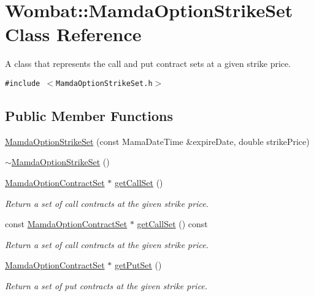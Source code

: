 \hypertarget{classWombat_1_1MamdaOptionStrikeSet}{
\section{Wombat::Mamda\-Option\-Strike\-Set Class Reference}
\label{classWombat_1_1MamdaOptionStrikeSet}
}
A class that represents the call and put contract sets at a given strike price.  


{\tt \#include $<$Mamda\-Option\-Strike\-Set.h$>$}

\subsection*{Public Member Functions}
\begin{CompactItemize}
\item 
\hyperlink{classWombat_1_1MamdaOptionStrikeSet_b92d440338d96f89c7dea5b4533e887b}{Mamda\-Option\-Strike\-Set} (const Mama\-Date\-Time \&expire\-Date, double strike\-Price)
\item 
\hyperlink{classWombat_1_1MamdaOptionStrikeSet_f37e76aea47c9c23f9ba2a0c5c2a6d6f}{$\sim$Mamda\-Option\-Strike\-Set} ()
\item 
\hyperlink{classWombat_1_1MamdaOptionContractSet}{Mamda\-Option\-Contract\-Set} $\ast$ \hyperlink{classWombat_1_1MamdaOptionStrikeSet_54ca15944e44eb147527c1c606e9624f}{get\-Call\-Set} ()
\begin{CompactList}\small\item\em Return a set of call contracts at the given strike price. \item\end{CompactList}\item 
const \hyperlink{classWombat_1_1MamdaOptionContractSet}{Mamda\-Option\-Contract\-Set} $\ast$ \hyperlink{classWombat_1_1MamdaOptionStrikeSet_59c81546d87ef3569a9cfec1657752e0}{get\-Call\-Set} () const 
\begin{CompactList}\small\item\em Return a set of call contracts at the given strike price. \item\end{CompactList}\item 
\hyperlink{classWombat_1_1MamdaOptionContractSet}{Mamda\-Option\-Contract\-Set} $\ast$ \hyperlink{classWombat_1_1MamdaOptionStrikeSet_d17cabbb0f8477a8908d2a978508fc05}{get\-Put\-Set} ()
\begin{CompactList}\small\item\em Return a set of put contracts at the given strike price. \item\end{CompactList}\item 

\end{CompactItemize}
